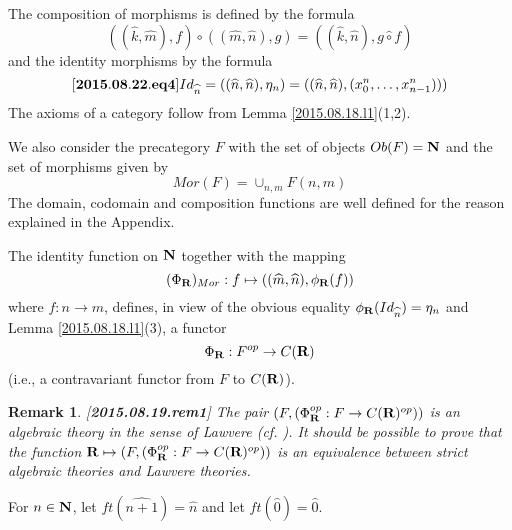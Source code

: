 \documentclass[11pt]{article}
\newenvironment{eq}{\begin{equation}}{\end{equation}}
\newtheorem{remark}[proposition]{Remark}
\newcommand{\llabel}[1]{\label{#1}[{\bf #1}]}
\newcommand{\sr}{\rightarrow}
\newcommand{\nn}{{\bf N\rm}}
\newcommand{\nat}{\nn}
\newcommand{\rr}{{\bf R}}
\newcommand{\wh}{\widehat}
\newcommand{\hc}{\wh{\circ}}
\begin{document}
The composition of morphisms is defined by the formula
%
$$((\wh{k},\wh{m}),f)\circ ((\wh{m},\wh{n}),g)=((\wh{k},\wh{n}),g\hc f)$$
%
and the identity morphisms by the formula
%
\begin{eq}
\llabel{2015.08.22.eq4}
Id_{\wh{n}}=((\wh{n},\wh{n}),\eta_n)=((\wh{n},\wh{n}),(x_0^n,\dots,x^n_{n-1})))
\end{eq}
%
%
The axioms of a category follow from Lemma \ref{2015.08.18.l1}(1,2). 

We also consider the precategory $F$ with the set of objects $Ob(F)=\nn$ and the set of morphisms given by
%
$$Mor(F)=\cup_{n,m}F(n,m)$$
%
The domain, codomain and composition functions are well defined for the reason explained in the Appendix. 

The identity function on $\nn$ together with the mapping
%
$$(\Phi_{\rr})_{Mor}:f\mapsto ((\wh{m},\wh{n}),\phi_{\rr}(f))$$
%
where $f:n\sr m$, defines, in view of the obvious equality $\phi_{\rr}(Id_{\wh{n}})=\eta_{n}$ and Lemma \ref{2015.08.18.l1}(3), a functor
%
$$\Phi_{\rr}:F^{op}\sr C(\rr)$$
%
(i.e., a contravariant functor from $F$ to $C(\rr)$). 
%
\begin{remark}\rm
\llabel{2015.08.19.rem1}
The pair $(F,(\Phi^{op}_{\rr}:F\sr C(\rr)^{op}))$ is an algebraic theory in the sense of Lawvere (cf. \cite[Definition on p.62]{Lawvere}). It should be possible to prove that the function $\rr\mapsto (F,(\Phi^{op}_{\rr}:F\sr C(\rr)^{op}))$ is an equivalence between strict algebraic theories and Lawvere theories. 
\end{remark}
%

For $n\in\nat$, let $ft(\wh{n+1})=\wh{n}$ and let $ft(\wh{0})=\wh{0}$.
\end{document}
